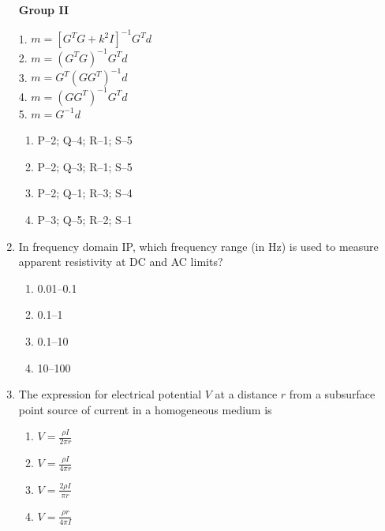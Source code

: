 \documentclass[journal,12pt,onecolumn]{IEEEtran}
\theoremstyle{remark}
\begin{document}
\begin{enumerate}
\begin{multicols}{2}
\columnbreak

\textbf{Group II}  
\begin{flushleft}
1. \( m = [G^T G + k^2 I]^{-1} G^T d \)\\
2. \( m = (G^T G)^{-1} G^T d \)\\
3. \( m = G^T (G G^T)^{-1} d \)\\
4. \( m = (G G^T)^{-1} G^T d \)\\
5. \( m = G^{-1} d \)
\end{flushleft}
\end{multicols}

\begin{multicols}{2}
\begin{enumerate}
\item P--2; Q--4; R--1; S--5  
\item P--2; Q--3; R--1; S--5  
\item P--2; Q--1; R--3; S--4  
\item P--3; Q--5; R--2; S--1  
\end{enumerate}
\end{multicols}

\item In frequency domain IP, which frequency range (in Hz) is used to measure apparent resistivity at DC and AC limits?

\begin{multicols}{4}
\begin{enumerate}
\item 0.01--0.1  
\item 0.1--1  
\item 0.1--10  
\item 10--100  
\end{enumerate}
\end{multicols}

\item The expression for electrical potential \( V \) at a distance \( r \) from a subsurface point source of current in a homogeneous medium is

\begin{multicols}{4}
\begin{enumerate}
\item \( V = \frac{\rho I}{2\pi r} \)  
\item \( V = \frac{\rho I}{4\pi r} \)  
\item \( V = \frac{2\rho I}{\pi r} \)  
\item \( V = \frac{\rho r}{4\pi I} \)  
\end{enumerate}
\end{multicols}


\end{enumerate}
\end{document}
